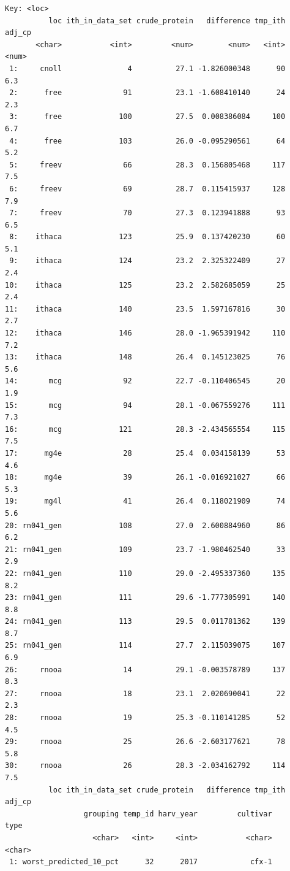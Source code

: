 \documentclass[
]{agujournal2019}
\begin{document}
\begin{verbatim}
Key: <loc>
          loc ith_in_data_set crude_protein   difference tmp_ith adj_cp
       <char>           <int>         <num>        <num>   <int>  <num>
 1:     cnoll               4          27.1 -1.826000348      90    6.3
 2:      free              91          23.1 -1.608410140      24    2.3
 3:      free             100          27.5  0.008386084     100    6.7
 4:      free             103          26.0 -0.095290561      64    5.2
 5:     freev              66          28.3  0.156805468     117    7.5
 6:     freev              69          28.7  0.115415937     128    7.9
 7:     freev              70          27.3  0.123941888      93    6.5
 8:    ithaca             123          25.9  0.137420230      60    5.1
 9:    ithaca             124          23.2  2.325322409      27    2.4
10:    ithaca             125          23.2  2.582685059      25    2.4
11:    ithaca             140          23.5  1.597167816      30    2.7
12:    ithaca             146          28.0 -1.965391942     110    7.2
13:    ithaca             148          26.4  0.145123025      76    5.6
14:       mcg              92          22.7 -0.110406545      20    1.9
15:       mcg              94          28.1 -0.067559276     111    7.3
16:       mcg             121          28.3 -2.434565554     115    7.5
17:      mg4e              28          25.4  0.034158139      53    4.6
18:      mg4e              39          26.1 -0.016921027      66    5.3
19:      mg4l              41          26.4  0.118021909      74    5.6
20: rn041_gen             108          27.0  2.600884960      86    6.2
21: rn041_gen             109          23.7 -1.980462540      33    2.9
22: rn041_gen             110          29.0 -2.495337360     135    8.2
23: rn041_gen             111          29.6 -1.777305991     140    8.8
24: rn041_gen             113          29.5  0.011781362     139    8.7
25: rn041_gen             114          27.7  2.115039075     107    6.9
26:     rnooa              14          29.1 -0.003578789     137    8.3
27:     rnooa              18          23.1  2.020690041      22    2.3
28:     rnooa              19          25.3 -0.110141285      52    4.5
29:     rnooa              25          26.6 -2.603177621      78    5.8
30:     rnooa              26          28.3 -2.034162792     114    7.5
          loc ith_in_data_set crude_protein   difference tmp_ith adj_cp
                  grouping temp_id harv_year         cultivar         type
                    <char>   <int>     <int>           <char>       <char>
 1: worst_predicted_10_pct      32      2017            cfx-1             

\end{verbatim}
\end{document}
